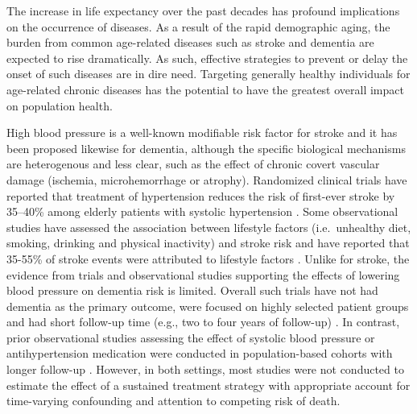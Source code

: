 \documentclass[
]{book}
\begin{document}
The increase in life expectancy over the past decades has profound implications on the occurrence of diseases. As a result of the rapid demographic aging, the burden from common age-related diseases such as stroke and dementia are expected to rise dramatically\autocite{larson2008}. As such, effective strategies to prevent or delay the onset of such diseases are in dire need. Targeting generally healthy individuals for age-related chronic diseases has the potential to have the greatest overall impact on population health\autocite{bauer2014}.

High blood pressure is a well-known modifiable risk factor for stroke\autocite{johnson2019} and it has been proposed likewise for dementia\autocite{lancet2020}, although the specific biological mechanisms are heterogenous and less clear, such as the effect of chronic covert vascular damage (ischemia, microhemorrhage or atrophy)\autocite{hughes2020}. Randomized clinical trials have reported that treatment of hypertension reduces the risk of first-ever stroke by 35--40\% among elderly patients with systolic hypertension \autocite{ace_inhibitors2000,chobanian2003}. Some observational studies have assessed the association between lifestyle factors (i.e.~unhealthy diet, smoking, drinking and physical inactivity) and stroke risk and have reported that 35-55\% of stroke events were attributed to lifestyle factors \autocite{braillon2015,zhang2012,prince1996}. Unlike for stroke, the evidence from trials and observational studies supporting the effects of lowering blood pressure on dementia risk is limited. Overall such trials have not had dementia as the primary outcome, were focused on highly selected patient groups and had short follow-up time (e.g., two to four years of follow-up) \autocite{ace_inhibitors2000,prince1996,forette2002,progress2003,lithell2003,diener2008,anderson2011,williamson2019,ding2020}. In contrast, prior observational studies assessing the effect of systolic blood pressure or antihypertension medication were conducted in population-based cohorts with longer follow-up \autocite{ding2020,liang2018}. However, in both settings, most studies were not conducted to estimate the effect of a sustained treatment strategy with appropriate account for time-varying confounding and attention to competing risk of death.
\end{document}
